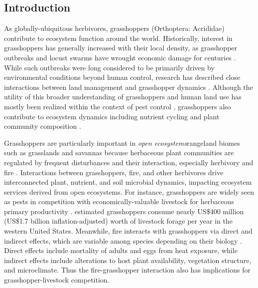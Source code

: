 \documentclass[referee, 
	            sn-basic]
           {sn-jnl}
\begin{document}
\maketitle
\begin{linenumbers}

\section{Introduction}

As globally-ubiquitous herbivores, grasshoppers (Orthoptera: Acrididae) contribute to ecosystem function around the world. 
Historically, interest in grasshoppers has generally increased with their local density, as grasshopper outbreaks and locust swarms have wrought economic damage for centuries \citep{cease2015}. 
While such outbreaks were long considered to be primarily driven by environmental conditions beyond human control, research has described close interactions between land management and grasshopper dynamics \citep{legall2019}. 
Although the utility of this broader understanding of grasshoppers and human land use has mostly been realized within the context of pest control \citep{branson2006}, grasshoppers also contribute to ecosystem dynamics including nutrient cycling and plant community composition \citep{meyer2002,zhang2011,kietzka2021, belovsky2000}. 

Grasshoppers are particularly important in \emph{open ecosystems}\textemdash rangeland biomes such as grasslands and savannas because herbaceous plant communities are regulated by frequent disturbances and their interaction, especially herbivory and fire \citep{bond2022}. 
Interactions between grasshoppers, fire, and other herbivores drive interconnected plant, nutrient, and soil microbial dynamics, impacting ecosystem services derived from open ecosystems.
For instance, grasshoppers are widely seen as pests in competition with economically-valuable livestock for herbaceous primary productivity \citep{zhang2019}. 
\citet{hewitt1983} estimated grasshoppers consume nearly US\$400 million (US\$1.7 billion inflation-adjusted) worth of livestock forage per year in the western United States.  
Meanwhile, fire interacts with grasshoppers via direct and indirect effects, which are variable among species depending on their biology \citep[e.g.][]{vermeire2004}. 
Direct effects include mortality of adults and eggs from heat exposure, while indirect effects include alterations to host plant availability, vegetation structure, and microclimate.
Thus the fire-grasshopper interaction also has implications for grasshopper-livestock competition. 


\end{linenumbers}
\end{document}
